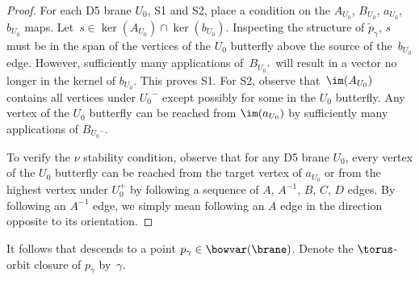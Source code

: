\begin{proof}
For each D5 brane $U_0$, S1 and S2, place a condition on the $A_{U_0}$, $B_{U_0}$, $a_{U_0}$, $b_{U_0}$ maps. Let~${s \in \ker(A_{U_0}) \cap \ker(b_{U_0})}$. Inspecting the structure of $\tilde{p}_\gamma$, $s$ must be in the span of the vertices of the $U_0$ butterfly above the source of the~$b_{U_0}$ edge. However, sufficiently many applications of~$B_{{U_0}^+}$ will result in a vector no longer in the kernel of $b_{U_0}$. This proves S1. For S2, observe that~$\im(A_{U_0})$ contains all vertices under ${U_0}^-$ except possibly for some in the $U_0$ butterfly. Any vertex of the $U_0$ butterfly can be reached from $\im(a_{U_0})$ by sufficiently many applications of $B_{{U_0}^-}$.

To verify the $\nu$ stability condition, observe that for any D5 brane $U_0$, every vertex of the $U_0$ butterfly can be reached from the target vertex of $a_{U_0}$ or from the highest vertex under $U_0^+$ by following a sequence of $A$, $A^{-1}$, $B$, $C$, $D$ edges. By following an $A^{-1}$ edge, we simply mean following an $A$ edge in the direction opposite to its orientation.
\end{proof}

It follows that  descends to a point $p_\gamma \in \bowvar(\brane)$. Denote the $\torus$-orbit closure of $p_\gamma$ by~$\gamma$.

